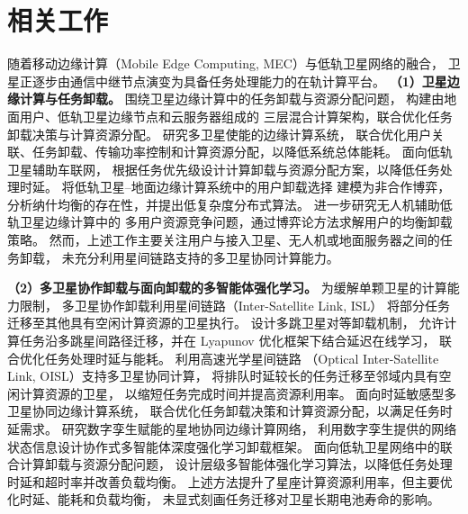 \documentclass[a4paper,11pt]{article}
\begin{document}
\section{相关工作}
\label{sec:related}

随着移动边缘计算（Mobile Edge Computing, MEC）与低轨卫星网络的融合，
卫星正逐步由通信中继节点演变为具备任务处理能力的在轨计算平台。
\noindent\textbf{（1）卫星边缘计算与任务卸载。}
围绕卫星边缘计算中的任务卸载与资源分配问题，
\cite{tang2021hybrid}构建由地面用户、低轨卫星边缘节点和云服务器组成的
三层混合计算架构，联合优化任务卸载决策与计算资源分配。
\cite{ms2024energy}研究多卫星使能的边缘计算系统，
联合优化用户关联、任务卸载、传输功率控制和计算资源分配，以降低系统总体能耗。
\cite{wang2025priority}面向低轨卫星辅助车联网，
根据任务优先级设计计算卸载与资源分配方案，以降低任务处理时延。
\cite{chen2025gdco}将低轨卫星--地面边缘计算系统中的用户卸载选择
建模为非合作博弈，分析纳什均衡的存在性，并提出低复杂度分布式算法。
\cite{chen2025uavgame}进一步研究无人机辅助低轨卫星边缘计算中的
多用户资源竞争问题，通过博弈论方法求解用户的均衡卸载策略。
然而，上述工作主要关注用户与接入卫星、无人机或地面服务器之间的任务卸载，
未充分利用星间链路支持的多卫星协同计算能力。



\noindent\textbf{（2）多卫星协作卸载与面向卸载的多智能体强化学习。}
为缓解单颗卫星的计算能力限制，
多卫星协作卸载利用星间链路（Inter-Satellite Link, ISL）
将部分任务迁移至其他具有空闲计算资源的卫星执行。
\cite{zhang2024mhspo}设计多跳卫星对等卸载机制，
允许计算任务沿多跳星间路径迁移，并在 Lyapunov 优化框架下结合延迟在线学习，
联合优化任务处理时延与能耗。
\cite{zhang2024oisl}利用高速光学星间链路
（Optical Inter-Satellite Link, OISL）支持多卫星协同计算，
将排队时延较长的任务迁移至邻域内具有空闲计算资源的卫星，
以缩短任务完成时间并提高资源利用率。
\cite{li2025dsms}面向时延敏感型多卫星协同边缘计算系统，
联合优化任务卸载决策和计算资源分配，以满足任务时延需求。
\cite{ji2023dtsat}研究数字孪生赋能的星地协同边缘计算网络，
利用数字孪生提供的网络状态信息设计协作式多智能体深度强化学习卸载框架。
\cite{lai2025hmadrl}面向低轨卫星网络中的联合计算卸载与资源分配问题，
设计层级多智能体强化学习算法，以降低任务处理时延和超时率并改善负载均衡。
上述方法提升了星座计算资源利用率，但主要优化时延、能耗和负载均衡，
未显式刻画任务迁移对卫星长期电池寿命的影响。
\end{document}
